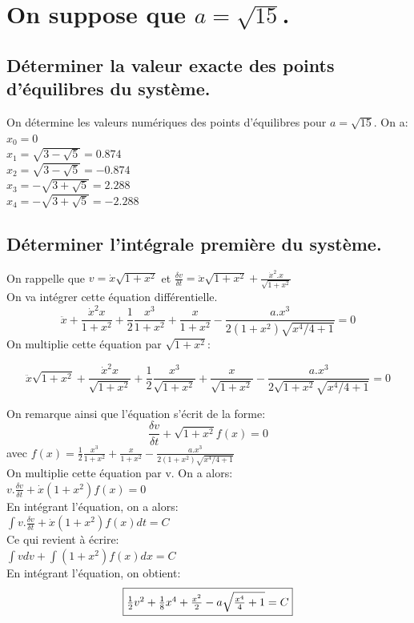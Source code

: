 \documentclass[10pt,a4paper]{article}
\begin{document}
\section{On suppose que $a=\sqrt{15}$.}
\subsection{Déterminer la valeur exacte des points d'équilibres du système.}
On détermine les valeurs numériques des points d'équilibres pour $a=\sqrt{15}$. On a:\\
$x_0=0$\\
$x_1=\sqrt{3 - \sqrt{5}}=0.874$\\
$x_2=\sqrt{3 - \sqrt{5}}=-0.874$\\
$x_3=-\sqrt{3 + \sqrt{5}}=2.288$\\
$x_4=-\sqrt{3 + \sqrt{5}}=-2.288$\\

\subsection{Déterminer l'intégrale première du système.}
	On rappelle que $v=\dot{x}\sqrt{1 + x^2}$ et $\frac{\delta{v}}{\delta{t}}=\ddot{x}\sqrt{1 + x^2} + \frac{\dot{x}^2.x}{\sqrt{1+x^2}}$ \\
On va intégrer cette équation différentielle.
\[  \ddot{x}+\frac{\dot{x}^2x}{1+x^2} + \frac{1}{2}\frac{x^3}{1+x^2} + \frac{x}{1+x^2} - \frac{a.x^3}{2(1+x^2)\sqrt{x^4/4+1}}=0 \]	
On multiplie cette équation par $\sqrt{1+x^2}$:

\[  \ddot{x}\sqrt{1+x^2}+\frac{\dot{x}^2x}{\sqrt{1+x^2}} + \frac{1}{2}\frac{x^3}{\sqrt{1+x^2}} + \frac{x}{\sqrt{1+x^2}} - \frac{a.x^3}{2\sqrt{1+x^2}\sqrt{x^4/4+1}}=0 \]	

On remarque ainsi que l'équation s'écrit de la forme:\\
\[ \frac{\delta{v}}{\delta{t}} + \sqrt{1+x^2}f(x) = 0 \] avec $f(x)=  \frac{1}{2}\frac{x^3}{1+x^2} + \frac{x}{1+x^2} - \frac{a.x^3}{2(1+x^2)\sqrt{x^4/4+1}}$ \\
On multiplie cette équation par v. On a alors:\\
$ v.\frac{\delta{v}}{\delta{t}} + \dot{x}(1+x^2)f(x) = 0$\\
En intégrant l'équation, on a alors:\\
$ \int v.\frac{\delta{v}}{\delta{t}} + \dot{x}(1+x^2)f(x) dt= C$\\
Ce qui revient à écrire:\\
$ \int vdv + \int (1+x^2)f(x)dx= C$\\
En intégrant l'équation, on obtient:\\
\[\fbox{$ \frac{1}{2}v^2 + \frac{1}{8}x^4 + \frac{x^2}{2} - a\sqrt{\frac{x^4}{4} + 1} = C  $}\]
\end{document}
